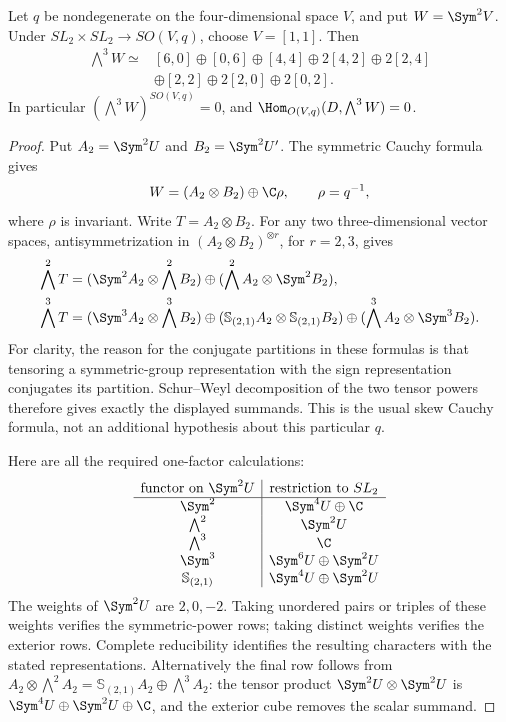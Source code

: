 \begin{lemma}
\label{lem:orthogonal-exterior-cube}
Let \(q\) be nondegenerate on the four-dimensional space \(V\),
and put \(W=\Sym^2V\).  Under \(SL_2\times SL_2\to SO(V,q)\),
choose \(V=[1,1]\).  Then
\begin{equation}\label{eq:explicit-so4-exterior-cube}
\begin{split}
 \bigwedge^3 W\simeq{}&[6,0]\oplus[0,6]\oplus[4,4]
       \oplus2[4,2]\oplus2[2,4]\\
       &\oplus[2,2]\oplus2[2,0]\oplus2[0,2].
\end{split}
\end{equation}
In particular \((\bigwedge^3W)^{SO(V,q)}=0\), and
\(\Hom_{O(V,q)}(D,\bigwedge^3W)=0\).
\end{lemma}
\begin{proof}
Put \(A_2=\Sym^2U\) and \(B_2=\Sym^2U'\).
The symmetric Cauchy formula gives
\[
 W=(A_2\otimes B_2)\oplus\C\rho,
                 \qquad \rho=q^{-1},
\]
where \(\rho\) is invariant.  Write \(T=A_2\otimes B_2\).
For any two three-dimensional vector spaces, antisymmetrization in
\((A_2\otimes B_2)^{\otimes r}\), for \(r=2,3\), gives
\begin{align*}
 \bigwedge^2T&=(\Sym^2A_2\otimes\bigwedge^2B_2)
                 \oplus(\bigwedge^2A_2\otimes\Sym^2B_2),\\
 \bigwedge^3T&=(\Sym^3A_2\otimes\bigwedge^3B_2)
       \oplus(\mathbb S_{(2,1)}A_2\otimes\mathbb S_{(2,1)}B_2)
       \oplus(\bigwedge^3A_2\otimes\Sym^3B_2).
\end{align*}
For clarity, the reason for the conjugate partitions in these formulas
is that tensoring a symmetric-group representation with the sign
representation conjugates its partition.  Schur--Weyl decomposition
of the two tensor powers therefore gives exactly the displayed
summands.  This is the usual skew Cauchy formula, not an additional
hypothesis about this particular \(q\).

Here are all the required one-factor calculations:
\begin{equation}\label{eq:spin-one-calculations}
\begin{array}{c|c}
\text{functor on }\Sym^2U&\text{restriction to }SL_2\\ \hline
\Sym^2&\Sym^4U\oplus\C\\
\bigwedge^2&\Sym^2U\\
\bigwedge^3&\C\\
\Sym^3&\Sym^6U\oplus\Sym^2U\\
\mathbb S_{(2,1)}&\Sym^4U\oplus\Sym^2U
\end{array}
\end{equation}
The weights of \(\Sym^2U\) are \(2,0,-2\).
Taking unordered pairs or triples of these weights verifies the
symmetric-power rows; taking distinct weights verifies the exterior
rows.  Complete reducibility identifies the resulting characters
with the stated representations.  Alternatively the final row
follows from
\(A_2\otimes\bigwedge^2A_2=
\mathbb S_{(2,1)}A_2\oplus\bigwedge^3A_2\): the tensor product
\(\Sym^2U\otimes\Sym^2U\) is
\(\Sym^4U\oplus\Sym^2U\oplus\C\), and the exterior cube
removes the scalar summand.


\end{proof}
